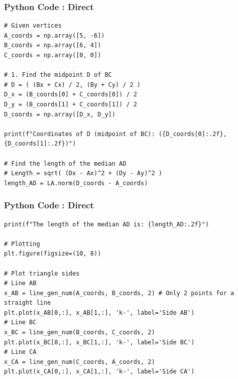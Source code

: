 \documentclass{beamer}
\begin{document}
\begin{frame}[fragile]
\frametitle{Python Code : Direct}

\begin{lstlisting}
# Given vertices
A_coords = np.array([5, -6])
B_coords = np.array([6, 4])
C_coords = np.array([0, 0])

# 1. Find the midpoint D of BC
# D = ( (Bx + Cx) / 2, (By + Cy) / 2 )
D_x = (B_coords[0] + C_coords[0]) / 2
D_y = (B_coords[1] + C_coords[1]) / 2
D_coords = np.array([D_x, D_y])

print(f"Coordinates of D (midpoint of BC): ({D_coords[0]:.2f}, {D_coords[1]:.2f})")

# Find the length of the median AD
# Length = sqrt( (Dx - Ax)^2 + (Dy - Ay)^2 )
length_AD = LA.norm(D_coords - A_coords)

\end{lstlisting}

\end{frame}
\begin{frame}[fragile]
\frametitle{Python Code : Direct}

\begin{lstlisting}
print(f"The length of the median AD is: {length_AD:.2f}")

# Plotting
plt.figure(figsize=(10, 8))

# Plot triangle sides
# Line AB
x_AB = line_gen_num(A_coords, B_coords, 2) # Only 2 points for a straight line
plt.plot(x_AB[0,:], x_AB[1,:], 'k-', label='Side AB')
# Line BC
x_BC = line_gen_num(B_coords, C_coords, 2)
plt.plot(x_BC[0,:], x_BC[1,:], 'k-', label='Side BC')
# Line CA
x_CA = line_gen_num(C_coords, A_coords, 2)
plt.plot(x_CA[0,:], x_CA[1,:], 'k-', label='Side CA')
\end{lstlisting}
\end{frame}
\end{document}
